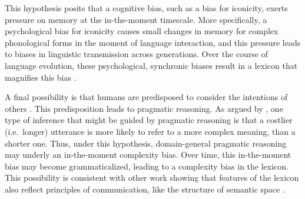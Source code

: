 
\hspace*{.3 cm}{ \it 3.\ The Memory Hypothesis.} This hypothesis posits that a cognitive bias, such as a bias for iconicity, exerts pressure on memory at the in-the-moment timescale. More specifically, a psychological bias for iconicity causes small changes in memory for complex phonological forms in the moment of language interaction, and  this  pressure leads to biases in linguistic transmission across generations. Over the course of language evolution, these psychological, synchronic biases result in a lexicon that magnifies this bias  \cite{griffiths2007language}. 


\hspace*{.3 cm}{ \it 4.\ The Pragmatic Hypothesis. } A final possibility is that humans are predisposed to consider the intentions of others \cite{tomasello2005understanding}. This predisposition leads to pragmatic reasoning. As argued by , one type of inference that might be guided by pragmatic reasoning is that a costlier (i.e.\ longer) utterance is more likely to refer to a more complex meaning, than a shorter one. Thus, under this hypothesis, domain-general pragmatic reasoning may underly an in-the-moment complexity bias. Over time, this in-the-moment bias may become grammaticalized, leading to a complexity bias in the lexicon. This possibility is consistent with other work showing that features of the lexicon also reflect principles of communication, like the structure of semantic space \cite{regier2007color,kemp2012kinship,piantadosi2012communicative}. 



